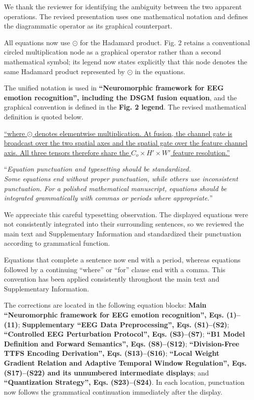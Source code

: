 \documentclass[12pt,technote,onecolumn]{IEEEtran}
\begin{document}
We thank the reviewer for identifying the ambiguity between the two apparent operations. The revised presentation uses one mathematical notation and defines the diagrammatic operator as its graphical counterpart.

All equations now use \(\odot\) for the Hadamard product. Fig. 2 retains
a conventional circled multiplication node as a graphical operator
rather than a second mathematical symbol; its legend now states
explicitly that this node denotes the same Hadamard product represented
by \(\odot\) in the equations.



The unified notation is used in \textbf{``Neuromorphic framework for EEG emotion recognition'', including the DSGM fusion equation}, and the graphical convention is defined in the \textbf{Fig. 2 legend}. The revised mathematical definition is quoted below.

\uline{``where $\odot$ denotes elementwise multiplication. At fusion, the channel gate is broadcast over the two spatial axes and the spatial gate over the feature channel axis. All three tensors therefore share the $C_o\times H'\times W'$ feature resolution.''}

\vspace{4mm}

``{\it Equation punctuation and typesetting should be standardized.\\
Some equations end without proper punctuation, while others use
inconsistent punctuation. For a polished mathematical manuscript,
equations should be integrated grammatically with commas or periods
where appropriate.}''
\vspace{1mm}


We appreciate this careful typesetting observation. The displayed equations were not consistently integrated into their surrounding sentences, so we reviewed the main text and Supplementary Information and standardized their punctuation according to grammatical function.

Equations that complete a sentence now end with a period, whereas
equations followed by a continuing ``where'' or ``for'' clause end with
a comma. This convention has been applied consistently throughout the
main text and Supplementary Information.

The corrections are located in the following equation blocks: \textbf{Main ``Neuromorphic framework for EEG emotion recognition'', Eqs. (1)--(11)}; \textbf{Supplementary ``EEG Data Preprocessing'', Eqs. (S1)--(S2)}; \textbf{``Controlled EEG Perturbation Protocol'', Eqs. (S3)--(S7)}; \textbf{``B1 Model Definition and Forward Semantics'', Eqs. (S8)--(S12)}; \textbf{``Division-Free TTFS Encoding Derivation'', Eqs. (S13)--(S16)}; \textbf{``Local Weight Gradient Relation and Adaptive Temporal Window Regulation'', Eqs. (S17)--(S22) and its unnumbered intermediate displays}; and \textbf{``Quantization Strategy'', Eqs. (S23)--(S24)}. In each location, punctuation now follows the grammatical continuation immediately after the display.
\end{document}
